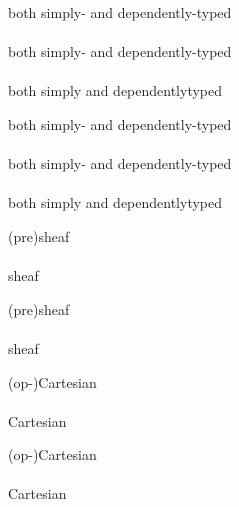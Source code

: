 \documentclass{article}
\begin{document}
\begin{verbatim*}
\begin{minipage}{0pt}
both simply- and dependently-typed\\\\
both simply\hyp{} and dependently\hyp{}typed\\\\
both simply\nbhyp{} and dependently\nbhyp{}typed\\
\end{minipage}
\end{verbatim*}
%
\begin{minipage}{0pt}
  both simply- and dependently-typed\\\\
  both simply\hyp{} and dependently\hyp{}typed\\\\
  both simply\nbhyp{} and dependently\nbhyp{}typed\\
\end{minipage}

\begin{verbatim*}
\begin{minipage}{0pt}
(pre)sheaf\\\\
sheaf\\
\end{minipage}
\end{verbatim*}
%
\begin{minipage}{0pt}
  (pre)sheaf\\\\
  sheaf\\
\end{minipage}

\begin{verbatim*}
\begin{minipage}{0pt}
(op-)Cartesian\\\\
Cartesian\\
\end{minipage}
\end{verbatim*}
%
\begin{minipage}{0pt}
  (op-)Cartesian\\\\
  Cartesian\\
\end{minipage}
\end{document}
